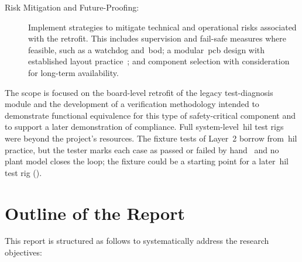 \begin{description}
	\item[Risk Mitigation and Future-Proofing:] Implement strategies to mitigate technical and operational risks associated with the retrofit. This includes supervision and fail-safe measures where feasible, such as a watchdog and~\gls{bod}; a modular~\gls{pcb} design with established layout practice~\cite{jones2004}; and component selection with consideration for long-term availability.
\end{description}

The scope is focused on the board-level retrofit of the legacy test-diagnosis module and the development of a verification methodology intended to demonstrate functional equivalence for this type of safety-critical component and to support a later demonstration of compliance. Full system-level~\gls{hil} test rigs were beyond the project's resources. The fixture tests of Layer~2 borrow from~\gls{hil} practice, but the tester marks each case as passed or failed by hand~\cite[Sec.~9.2]{dolata2023} and no plant model closes the loop; the fixture could be a starting point for a later~\gls{hil} test rig ().

\section{Outline of the Report}
\label{sec:outline}

This report is structured as follows to systematically address the research objectives:

